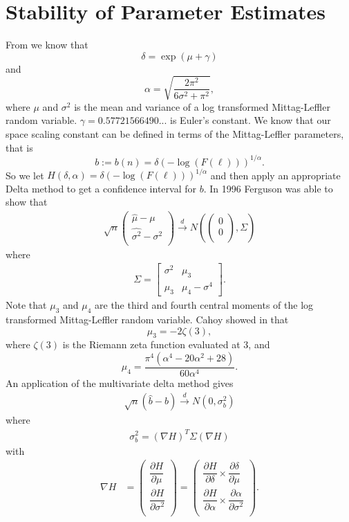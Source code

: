 \documentclass[honours,12pt]{unswthesis}
\newcommand{\1}{\mathbf 1}
\newcommand{\cd}{\overset{d}{\longrightarrow}}
\newcommand{\ppartial}[2]{\dfrac{\partial {#1}}{\partial {#2} }}
\numberwithin{equation}{section}
\theoremstyle{definition}
\theoremstyle{remark}
\begin{document}
\section{Stability of Parameter Estimates}
From \cite{Cahoy2013} we know that
\[
\delta=\exp(\mu +\gamma)
\]
and
\[
\alpha=\sqrt{\frac{2\pi^2}{6\sigma^2+\pi^2}},
\]
where $\mu$ and $\sigma^2$ is the mean and variance of a log transformed Mittag-Leffler random variable. $\gamma=0.57721566490...$ is Euler's constant. We know that our space scaling constant can be defined in terms of the Mittag-Leffler parameters, that is
\[ 
b:=b(n)=\delta(-\log(F(\ell)))^{1/\alpha}.
\]
So we let $H(\delta,\alpha)=\delta(-\log(F(\ell)))^{1/\alpha}$ and then apply an appropriate Delta method to get a confidence interval for $b$. In 1996 Ferguson was able to show that \cite{Ferguson1996}
\begin{align*}
	\sqrt{n}\begin{pmatrix}
				\hat{\mu}-\mu\\
				\hat{\sigma^2}-\sigma^2\\				
			\end{pmatrix}
			\cd
			N\left(\begin{pmatrix}0\\0\\ \end{pmatrix},\Sigma	\right)
\end{align*}
where
\begin{align*}
	\Sigma=\begin{bmatrix}
		\sigma^2	& \mu_3\\
		\mu_3		& \mu_4-\sigma^4
	\end{bmatrix}.
\end{align*}
Note that $\mu_3$ and $\mu_4$ are the third and fourth central moments of the log transformed Mittag-Leffler random variable. Cahoy showed in \cite{Cahoy2013} that
\[
\mu_3=-2\zeta(3),
\]
where $\zeta(3)$ is the Riemann zeta function evaluated at 3, and
\[
\mu_4=\frac{\pi^4(\alpha^4-20\alpha^2+28)}{60\alpha^4}.
\] 
An application of the multivariate delta method gives
\begin{align*}
\sqrt{n}(\hat{b}-b)\cd N(0,\sigma^2_b)
\end{align*}
where
\begin{align*}
\sigma^2_b=(\nabla H)^T \Sigma (\nabla H)
\end{align*}
with
\begin{align*}
	\nabla H &=\begin{pmatrix}
		\ppartial{H}{\mu}\\
		\ppartial{H}{\sigma^2}\\
	\end{pmatrix}
	=\begin{pmatrix}
		\ppartial{H}{\delta}\times\ppartial{\delta}{\mu}\\
		\ppartial{H}{\alpha}\times\ppartial{\alpha}{\sigma^2}\\
	\end{pmatrix}.
\end{align*}
\end{document}
